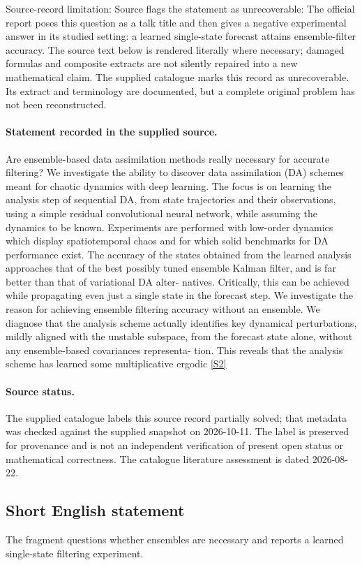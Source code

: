\documentclass[11pt]{article}
\begin{document}
Source-record limitation: Source flags the statement as unrecoverable: The official report poses this question as a talk title and then gives a negative experimental answer in its studied setting: a learned single-state forecast attains ensemble-filter accuracy.
The source text below is rendered literally where necessary; damaged formulas and composite extracts are not silently repaired into a new mathematical claim.
The supplied catalogue marks this record as unrecoverable. Its extract and terminology are documented, but a complete original problem has not been reconstructed.
\paragraph{Statement recorded in the supplied source.}
Are ensemble-based data assimilation methods really necessary for accurate filtering? We investigate the ability to discover data assimilation (DA) schemes meant for chaotic dynamics with deep learning. The focus is on learning the analysis step of sequential DA, from state trajectories and their observations, using a simple residual convolutional neural network, while assuming the dynamics to be known. Experiments are performed with low-order dynamics which display spatiotemporal chaos and for which solid benchmarks for DA performance exist. The accuracy of the states obtained from the learned analysis approaches that of the best possibly tuned ensemble Kalman filter, and is far better than that of variational DA alter- natives. Critically, this can be achieved while propagating even just a single state in the forecast step. We investigate the reason for achieving ensemble filtering accuracy without an ensemble. We diagnose that the analysis scheme actually identifies key dynamical perturbations, mildly aligned with the unstable subspace, from the forecast state alone, without any ensemble-based covariances representa- tion. This reveals that the analysis scheme has learned some multiplicative ergodic \href{https://doi.org/10.4171/owr/2025/10}{[S2]}
\paragraph{Source status.}
The supplied catalogue labels this source record partially solved; that metadata was checked against the supplied snapshot on 2026-10-11. The label is preserved for provenance and is not an independent verification of present open status or mathematical correctness. The catalogue literature assessment is dated 2026-08-22.
\subsection{Short English statement}
The fragment questions whether ensembles are necessary and reports a learned single-state filtering experiment.
\end{document}
